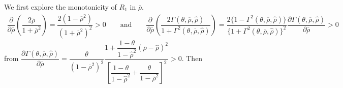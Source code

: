 \documentclass[10pt]{article}
\begin{document}
We first explore the monotonicity of {\footnotesize $ R_1 $} in {\footnotesize $ \overline{\rho} $}.
{\footnotesize \begin{eqnarray*}
\dfrac{\partial}{\partial \overline{\rho}} \left( \dfrac{2 \overline{\rho}}{1 + \overline{\rho}^2} \right) = \dfrac{2 (1 - \overline{\rho}^2)}{(1 + \overline{\rho}^2)^2} > 0 \qquad \text{and} \qquad \dfrac{\partial}{\partial \overline{\rho}} \left( \dfrac{2 \Gamma (\theta, \overline{\rho}, {\hat \rho})}{1 + \Gamma^2 (\theta, \overline{\rho}, {\hat \rho})} \right) = \dfrac{2 \{ 1 - \Gamma^2 (\theta, \overline{\rho}, {\hat \rho}) \}}{\{ 1 + \Gamma^2 (\theta, \overline{\rho}, {\hat \rho}) \}^2} \dfrac{\partial \Gamma (\theta, \overline{\rho}, {\hat \rho})}{\partial \overline{\rho}} > 0
\end{eqnarray*}}
from {\footnotesize $ \dfrac{\partial \Gamma (\theta, \overline{\rho}, {\hat \rho})}{\partial \overline{\rho}} = \dfrac{\theta}{(1 - \overline{\rho}^2)^2} \dfrac{1 + \dfrac{1 - \theta}{1 - {\hat \rho}^2} (\overline{\rho} - \hat{\rho})^2}{\left[ \dfrac{1 - \theta}{1 - {\hat \rho}^2} + \dfrac{\theta}{1 - \overline{\rho}^2} \right]^2} > 0 $}. Then
\end{document}
